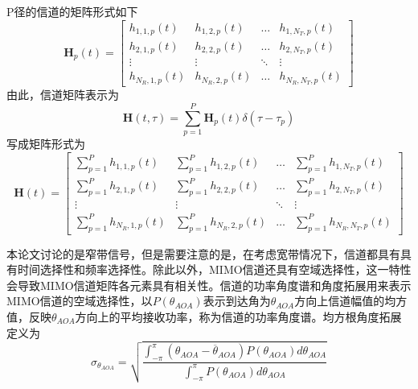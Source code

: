\documentclass[bachelor,nocolorlinks, printoneside]{seuthesis} %
\begin{document}
\begin{Main}
P径的信道的矩阵形式如下
\begin{equation}\label{key}
\mathbf{H}_{p}(t) = \left[ \begin{array}{cccc}
h_{1,1,p}(t) & h_{1,2,p}(t) & \ldots & h_{1,N_{T},p}(t) \\
h_{2,1,p}(t) & h_{2,2,p}(t) & \ldots & h_{2,N_{T},p}(t) \\
\vdots & \vdots & \ddots & \vdots \\
h_{N_{R},1,p}(t) & h_{N_{R},2,p}(t) & \ldots & h_{N_{R},N_{T},p}(t)
\end{array} \right] 
\end{equation}
由此，信道矩阵表示为
\begin{equation}\label{key}
\mathbf{H}(t,\tau) = \sum_{p=1}^{P}\mathbf{H}_{p}(t)\delta(\tau-\tau_{p})
\end{equation}
写成矩阵形式为
\begin{equation}\label{key}
\mathbf{H}(t) = \left[ \begin{array}{cccc}
\sum_{p=1}^{P}h_{1,1,p}(t) & \sum_{p=1}^{P}h_{1,2,p}(t) & \ldots & \sum_{p=1}^{P}h_{1,N_{T},p}(t) \\
\sum_{p=1}^{P}h_{2,1,p}(t) & \sum_{p=1}^{P}h_{2,2,p}(t) & \ldots & \sum_{p=1}^{P}h_{2,N_{T},p}(t) \\
\vdots & \vdots & \ddots & \vdots \\
\sum_{p=1}^{P}h_{N_{R},1,p}(t) & \sum_{p=1}^{P}h_{N_{R},2,p}(t) & \ldots & \sum_{p=1}^{P}h_{N_{R},N_{T},p}(t)
\end{array} \right]
\end{equation}

本论文讨论的是窄带信号，但是需要注意的是，在考虑宽带情况下，信道都具有具有时间选择性和频率选择性。除此以外，MIMO信道还具有空域选择性，这一特性会导致MIMO信道矩阵各元素具有相关性。信道的功率角度谱和角度拓展用来表示MIMO信道的空域选择性，以$P(\theta_{AOA})$表示到达角为$\theta_{AOA}$方向上信道幅值的均方值，反映$\theta_{AOA}$方向上的平均接收功率，称为信道的功率角度谱。均方根角度拓展定义为
\begin{equation}\label{key}
\sigma_{\theta_{AOA}}=\sqrt{
	\frac{\int_{-\pi}^{\pi}(\theta_{AOA}-\overline{\theta}_{AOA})P(\theta_{AOA})d\theta_{AOA}}
	{\int_{-\pi}^{\pi}P(\theta_{AOA})d\theta_{AOA}}
}
\end{equation}


\end{Main}
\end{document}
